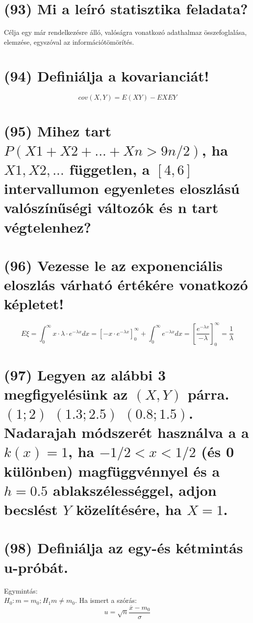 \documentclass[12p]{article}
\begin{document}
\section{(93) Mi a leíró statisztika feladata?}

Célja egy már rendelkezésre álló, valóságra vonatkozó adathalmaz összefoglalása, elemzése, egyszóval az információtömörítés.\\

\section{(94) Definiálja a kovarianciát!}

$$cov(X, Y) = E(XY) - EXEY$$

\section{(95) Mihez tart $P(X1+X2+ ... +Xn > 9n/2)$, ha $X1, X2, . . .$ független, a $[4,6]$ intervallumon
egyenletes eloszlású valószínűségi változók és n tart végtelenhez?}

\section{(96) Vezesse le az exponenciális eloszlás várható értékére vonatkozó képletet!}

$$E \xi = \int^{\infty}_0 x \cdot \lambda \cdot e^{-\lambda x} dx = [-x \cdot e^{-\lambda x}]^{\infty}_0 + \int^{\infty}_0 e^{-\lambda x} dx = \left[\frac{e^{-\lambda x}}{-\lambda} \right]^{\infty}_0 = \frac{1}{\lambda}$$

\section{(97) Legyen az alábbi 3 megfigyelésünk az $(X, Y)$ párra. $(1;2)$ $(1.3;2.5)$ $(0.8;1.5)$. Nadarajah
módszerét használva a a $k(x) = 1$, ha $-1/2 < x < 1/2$ (és 0 különben) magfüggvénnyel és a $h = 0.5$ ablakszélességgel, adjon becslést $Y$ közelítésére, ha $X = 1$.}

\section{(98) Definiálja az egy-és kétmintás u-próbát.}

Egymintás:\\
$H_0: m=m_0; H_1 m \neq m_0$. Ha ismert a szórás:
$$u = \sqrt{n}\frac{\overline{x} - m_0}{\sigma}$$
\end{document}
